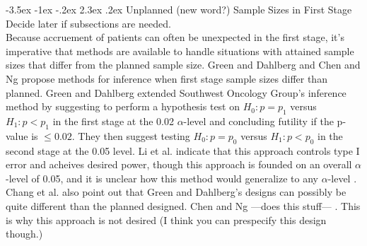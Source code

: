 \documentclass[12pt]{report}\usepackage[]{graphicx}\usepackage[]{color}
\makeatletter
\newlength{\li}\setlength{\li}{14.48pt}
\newlength{\di}\setlength{\di}{-3.5mm}
\renewcommand\section{ \@startsection {section}{1}{\z@}%
                                   {-3.5ex \@plus -1ex \@minus -.2ex}%
                                   {2.3ex \@plus.2ex}%
                                   {\centering\large\fontfamily{qcs}\selectfont}}
\makeatother
\begin{document}
\section{Unplanned (new word?) Sample Sizes in First Stage}
Decide later if subsections are needed.  \\
\newline
\indent Because accruement of patients can often be unexpected in the first stage, it's imperative that methods are available to handle situations with attained sample sizes that differ from the planned sample size. Green and Dahlberg \cite{Green} and Chen and Ng \cite{Chen} propose methods for inference when first stage sample sizes differ than planned. Green and Dahlberg extended Southwest Oncology Group's inference method by suggesting to perform a hypothesis test on $H_0: p=p_1$ versus $H_1: p < p_1$ in the first stage at the 0.02 $\alpha$-level and concluding futility if the p-value is $\leq 0.02$. They then suggest testing $H_0: p=p_0$ versus $H_1: p < p_0$ in the second stage at the 0.05 level. Li et al. indicate that this approach controls type I error and acheives desired power, though this approach is founded on an overall $\alpha$-level of 0.05, and it is unclear how this method would generalize to any $\alpha$-level \cite{Li}. Chang et al. also point out that Green and Dahlberg's designs can possibly be quite different than the planned designed. Chen and Ng ---does this stuff--- \cite{Chen}. This is why this approach is not desired (I think you can prespecify this design though.)
\end{document}
